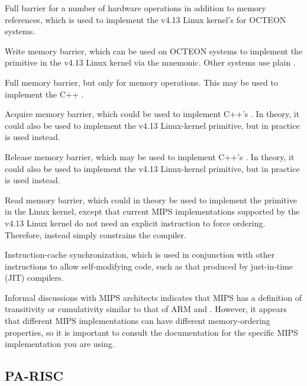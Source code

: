 \begin{description}[style=nextline]
\item[\tco{SYNC}]
	Full barrier for a number of hardware operations in addition
	to memory references, which is used to implement the v4.13
	Linux kernel's  for OCTEON systems.
\item[\tco{SYNC_WMB}]
	Write memory barrier, which can be used on OCTEON systems
	to implement the
	 primitive in the v4.13 Linux kernel via the
	 mnemonic.
	Other systems use plain .
\item[\tco{SYNC_MB}]
	Full memory barrier, but only for memory operations.
	This may be used to implement the 
	C++ .
\item[\tco{SYNC_ACQUIRE}]
	Acquire memory barrier, which could be used to implement
	C++'s .
	In theory, it could also be used to implement the v4.13 Linux-kernel
	 primitive, but in practice
	 is used instead.
\item[\tco{SYNC_RELEASE}]
	Release memory barrier, which may be used to implement
	C++'s .
	In theory, it could also be used to implement the v4.13 Linux-kernel
	 primitive, but in practice
	 is used instead.
\item[\tco{SYNC_RMB}]
	Read memory barrier, which could in theory be used to implement the
	 primitive in the Linux kernel, except that current
	MIPS implementations supported by the v4.13 Linux kernel do not
	need an explicit instruction to force ordering.
	Therefore,  instead simply constrains the compiler.
\item[\tco{SYNCI}]
	Instruction-cache synchronization, which is used in conjunction with
	other instructions to allow self-modifying code, such as that produced
	by just-in-time (JIT) compilers.
\end{description}

Informal discussions with MIPS architects indicates that MIPS has a
definition of transitivity or cumulativity similar to that of
ARM and \Power{}.
However, it appears that different MIPS implementations can have
different memory-ordering properties, so it is important to consult
the documentation for the specific MIPS implementation you are using.

\subsection{PA-RISC}

